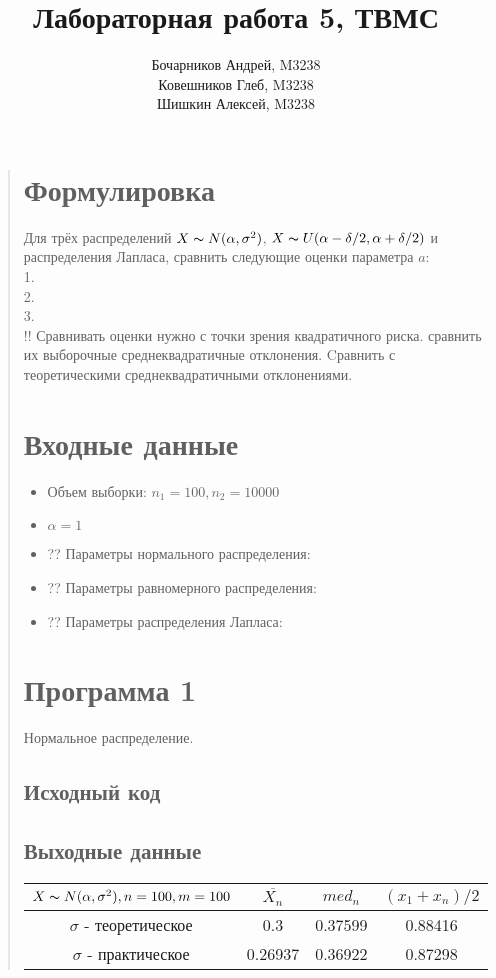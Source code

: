 \documentclass{article}
\begin{document}
\title{Лабораторная работа 5, ТВМС}
\author{
	Бочарников Андрей, M3238\\
	Ковешников Глеб, M3238\\
	Шишкин Алексей, M3238
}
\maketitle

\begin{quote}
\section{Формулировка}
	Для трёх распределений $X \thicksim N(\alpha, \sigma^2)$, $X \thicksim U(\alpha - \delta / 2, \alpha + \delta / 2)$ и распределения Лапласа, сравнить следующие оценки параметра $a$:\\
	1. \\
	2. \\
	3. \\
	!! Сравнивать оценки нужно с точки зрения квадратичного риска. сравнить их выборочные среднеквадратичные отклонения. Cравнить с теоретическими среднеквадратичными отклонениями.
\section{Входные данные}
        \begin{itemize}
            \item Объем выборки: $n_1 = 100, n_2 = 10000$
            \item $\alpha = 1$
	    \item ?? Параметры нормального распределения:
	    \item ?? Параметры равномерного распределения:
	    \item ?? Параметры распределения Лапласа: 
        \end{itemize}
\section{Программа 1}	
        Нормальное распределение. \\
\subsection{Исходный код}
	
\subsection{Выходные данные}
\renewcommand{\arraystretch}{1.8}
\begin{tabular}{ | c | c | c | c | }
\hline
$X \thicksim N(\alpha, \sigma^2), n = 100, m = 100$ & $\overline{X_n}$ & $med_n$ & $(x_1 + x_n) / 2$ \\ \hline
$\sigma$ - теоретическое &  0.3 & 0.37599 & 0.88416 \\ \hline
$\sigma$ - практическое & 0.26937 & 0.36922 & 0.87298 \\
\hline
\end{tabular}


\end{quote}
\end{document}
